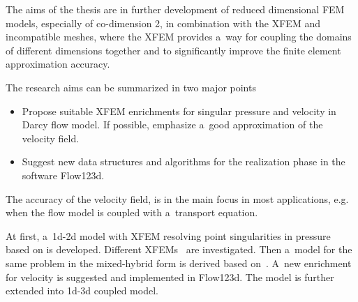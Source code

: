 
The aims of the thesis are in further development of reduced dimensional FEM models,
especially of co-dimension 2, in combination with the XFEM and incompatible meshes, where the XFEM provides
a~way for coupling the domains of different dimensions together and to significantly improve the finite element approximation accuracy.

The research aims can be summarized in two major points
\begin{itemize}
    \item Propose suitable XFEM enrichments for singular pressure and velocity in Darcy flow model. 
        If possible, emphasize a~good approximation of the velocity field.
        
    \item Suggest new data structures and algorithms for the realization phase in the software Flow123d. 
\end{itemize}
The accuracy of the velocity field, is in the main focus in most applications,
e.g. when the flow model is coupled with a~transport equation.


At first, a~1d-2d model with XFEM resolving point singularities in pressure
based on \cite{gracie_modelling_2010,craig_using_2011} is developed.
Different XFEMs~\cite{fries_corrected_2008, babuska_stable_2012} are investigated.
Then a~model for the same problem in the mixed-hybrid form is derived based on~\cite{sistek_bddc_2015}.
A~new enrichment for velocity is suggested and implemented in Flow123d.
The model is further extended into 1d-3d coupled model.


